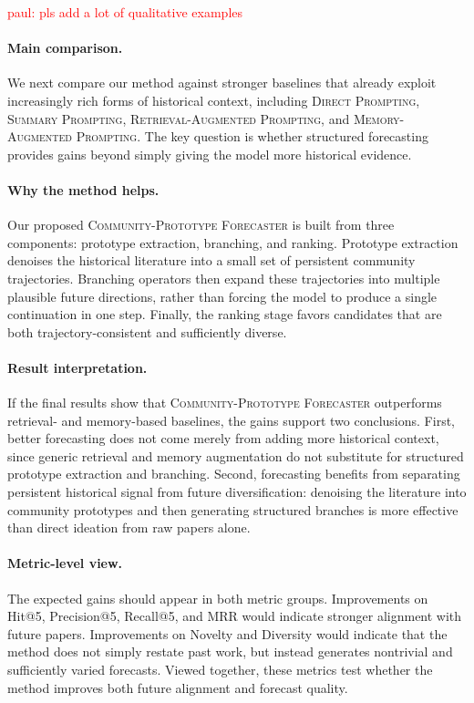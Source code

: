 \documentclass{article} %
\newcommand{\paul}[1]{\textcolor{red}{paul: #1}}
\begin{document}
\paul{pls add a lot of qualitative examples}

\paragraph{Main comparison.}
We next compare our method against stronger baselines that already exploit increasingly rich forms of historical context, including \textsc{Direct Prompting}, \textsc{Summary Prompting}, \textsc{Retrieval-Augmented Prompting}, and \textsc{Memory-Augmented Prompting}. The key question is whether structured forecasting provides gains beyond simply giving the model more historical evidence.

\paragraph{Why the method helps.}
Our proposed \textsc{Community-Prototype Forecaster} is built from three components: prototype extraction, branching, and ranking. Prototype extraction denoises the historical literature into a small set of persistent community trajectories. Branching operators then expand these trajectories into multiple plausible future directions, rather than forcing the model to produce a single continuation in one step. Finally, the ranking stage favors candidates that are both trajectory-consistent and sufficiently diverse.

\paragraph{Result interpretation.}
If the final results show that \textsc{Community-Prototype Forecaster} outperforms retrieval- and memory-based baselines, the gains support two conclusions. First, better forecasting does not come merely from adding more historical context, since generic retrieval and memory augmentation do not substitute for structured prototype extraction and branching. Second, forecasting benefits from separating persistent historical signal from future diversification: denoising the literature into community prototypes and then generating structured branches is more effective than direct ideation from raw papers alone.

\paragraph{Metric-level view.}
The expected gains should appear in both metric groups. Improvements on Hit@5, Precision@5, Recall@5, and MRR would indicate stronger alignment with future papers. Improvements on Novelty and Diversity would indicate that the method does not simply restate past work, but instead generates nontrivial and sufficiently varied forecasts. Viewed together, these metrics test whether the method improves both future alignment and forecast quality.
\end{document}
